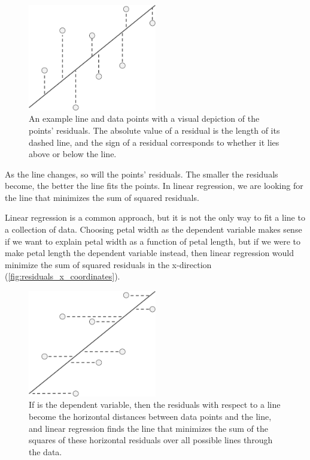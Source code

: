 \begin{figure}[h]
\centering
\mySfFamily
\includegraphics[width = 0.5\textwidth]{../images/residuals_y_coordinates.png}
\caption{An example line and data points with a visual depiction of the points' residuals. The absolute value of a residual is the length of its dashed line, and the sign of a residual corresponds to whether it lies above or below the line.}
\label{fig:residuals_y_coordinates}
\end{figure}

As the line changes, so will the points' residuals. The smaller the residuals become, the better the line fits the points. In linear regression, we are looking for the line that minimizes the sum of squared residuals.

Linear regression is a common approach, but it is not the only way to fit a line to a collection of data. Choosing petal width as the dependent variable makes sense if we want to explain petal width as a function of petal length, but if we were to make petal length the dependent variable instead, then linear regression would minimize the sum of squared residuals in the x-direction (\autoref{fig:residuals_x_coordinates}).\\

\begin{figure}[h]
\centering
\mySfFamily
\includegraphics[width = 0.5\textwidth]{../images/residuals_x_coordinates.png}
\caption{If  is the dependent variable, then the residuals with respect to a line become the horizontal distances between data points and the line, and linear regression finds the line that minimizes the sum of the squares of these horizontal residuals over all possible lines through the data.}
\label{fig:residuals_x_coordinates}
\end{figure}

